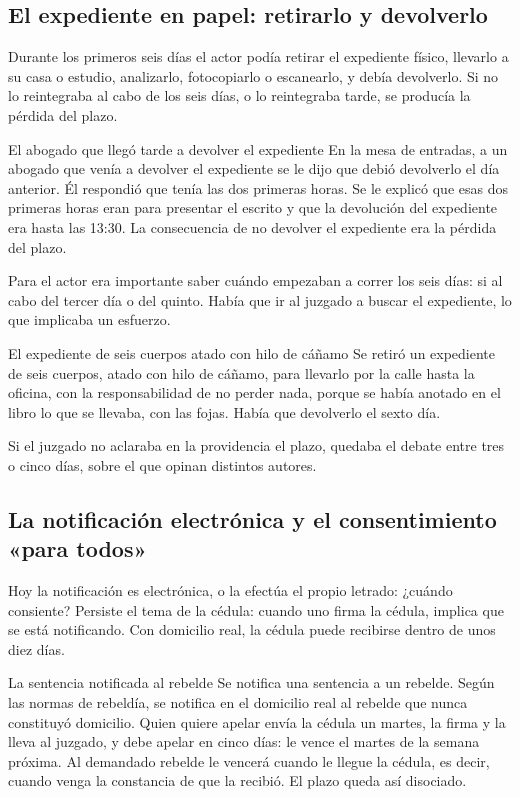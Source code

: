 \documentclass[12pt,oneside]{book}
\begin{document}
\subsection{El expediente en papel: retirarlo y devolverlo}

Durante los primeros seis días el actor podía retirar el expediente físico, llevarlo a su casa o estudio, analizarlo, fotocopiarlo o escanearlo, y debía devolverlo. Si no lo reintegraba al cabo de los seis días, o lo reintegraba tarde, se producía la pérdida del plazo.

\begin{example}{El abogado que llegó tarde a devolver el expediente}
En la mesa de entradas, a un abogado que venía a devolver el expediente se le dijo que debió devolverlo el día anterior. Él respondió que tenía las dos primeras horas. Se le explicó que esas dos primeras horas eran para presentar el escrito y que la devolución del expediente era hasta las 13:30. La consecuencia de no devolver el expediente era la pérdida del plazo.
\end{example}

Para el actor era importante saber cuándo empezaban a correr los seis días: si al cabo del tercer día o del quinto. Había que ir al juzgado a buscar el expediente, lo que implicaba un esfuerzo.

\begin{example}{El expediente de seis cuerpos atado con hilo de cáñamo}
Se retiró un expediente de seis cuerpos, atado con hilo de cáñamo, para llevarlo por la calle hasta la oficina, con la responsabilidad de no perder nada, porque se había anotado en el libro lo que se llevaba, con las fojas. Había que devolverlo el sexto día.
\end{example}

Si el juzgado no aclaraba en la providencia el plazo, quedaba el debate entre tres o cinco días, sobre el que opinan distintos autores.

\subsection{La notificación electrónica y el consentimiento «para todos»}

Hoy la notificación es electrónica, o la efectúa el propio letrado: ¿cuándo consiente? Persiste el tema de la cédula: cuando uno firma la cédula, implica que se está notificando. Con domicilio real, la cédula puede recibirse dentro de unos diez días.

\begin{example}{La sentencia notificada al rebelde}
Se notifica una sentencia a un rebelde. Según las normas de rebeldía, se notifica en el domicilio real al rebelde que nunca constituyó domicilio. Quien quiere apelar envía la cédula un martes, la firma y la lleva al juzgado, y debe apelar en cinco días: le vence el martes de la semana próxima. Al demandado rebelde le vencerá cuando le llegue la cédula, es decir, cuando venga la constancia de que la recibió. El plazo queda así disociado.
\end{example}
\end{document}
